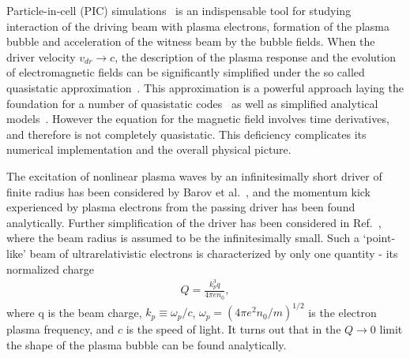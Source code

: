 \documentclass[twocolumn,showpacs,aip]{revtex4}
\begin{document}
Particle-in-cell  (PIC) simulations~\cite{fonseca_osiris_2002,Pukhov_code, Nieter_2004}  is an indispensable tool for studying interaction of the driving beam with  plasma electrons, formation of the plasma bubble  and acceleration of the witness beam by the bubble fields. 
When the driver velocity $v_{dr}\rightarrow c$, 
the description of the plasma response and the evolution of electromagnetic fields 
 can be significantly simplified under the so called quasistatic approximation~\cite{Sprangle_1990,Mora_1997}. This approximation is a powerful approach laying the foundation for a number of quasistatic codes~\cite{Mora_1997,lotov_fine__2003,Huang_QUICK_2006} as well as simplified analytical models~\cite{Kostyukov_phenomenological_2004,Lu_theory_2006,Yi_Analytic_2013}. However the equation for the magnetic field involves time derivatives, and therefore is not completely quasistatic.  This deficiency complicates its numerical implementation   %
and the overall physical picture.

The excitation of  nonlinear plasma waves by an  infinitesimally short driver   of  finite radius has been considered by Barov et al.~\cite{barov_energy_2004}, and the  momentum kick experienced by  plasma electrons from the passing driver   has been found analytically. Further simplification  of the driver has been considered in Ref.~\cite{stupakov_wake_2016}, where  the   beam radius is assumed to be the infinitesimally small. 
Such a `point-like' beam of ultrarelativistic electrons is characterized by only one quantity - its normalized charge 
\begin{eqnarray}
Q=\frac{k_p^3q}{4\pi e n_0},
\end{eqnarray}
where q is the beam charge,   $k_p\equiv\omega_p/c$, $\omega_p=(4\pi e^2n_0/m)^{1/2}$  is the electron plasma frequency, 
and $c$ is the speed of light. It turns out that in the  $Q\rightarrow 0$ limit the shape of the plasma bubble can be found analytically. 
 

\end{document}
